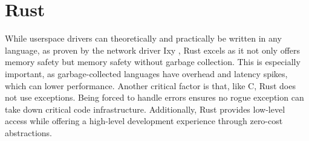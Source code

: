 \section{Rust}
While userspace drivers can theoretically and practically be written in any language, as proven by the network driver Ixy \cite{ixylanggithub}, Rust excels as it not only offers memory safety but memory safety without garbage collection. This is especially important, as garbage-collected languages have overhead and latency spikes, which can lower performance. Another critical factor is that, like C, Rust does not use exceptions. Being forced to handle errors ensures no rogue exception can take down critical code infrastructure.
Additionally, Rust provides low-level access while offering a high-level development experience through zero-cost abstractions.